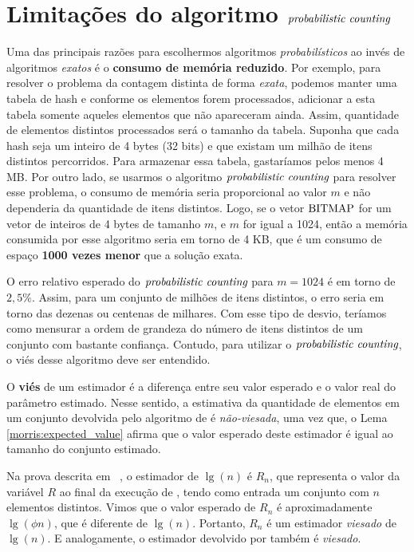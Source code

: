 \section{Limitações do algoritmo $\textit{probabilistic counting}$}

Uma das principais razões para escolhermos algoritmos \textit{probabilísticos} ao invés de algoritmos \textit{exatos} é 
o \textbf{consumo de memória reduzido}. Por exemplo, para resolver o problema da contagem distinta de forma 
\textit{exata}, podemos manter uma tabela de hash e conforme os elementos forem processados, adicionar a esta tabela 
somente aqueles elementos que não apareceram ainda. Assim,  quantidade de elementos distintos processados será o tamanho 
da tabela. Suponha que cada hash seja um inteiro de 4 bytes (32 bits) e que existam um milhão de itens distintos 
percorridos. Para armazenar essa tabela, gastaríamos pelos menos 4 MB. Por outro lado, se usarmos o algoritmo 
$\textit{probabilistic counting}$ para resolver esse problema, o consumo de memória seria proporcional ao valor $m$ e não dependeria da 
quantidade de itens distintos. Logo, se o vetor $\text{BITMAP}$ for um vetor de inteiros de 4 bytes de tamanho $m$, e 
$m$ for igual a 1024, então a memória consumida por esse algoritmo seria em torno de 4 KB, que é um consumo de espaço
\textbf{1000 vezes menor} que a solução exata.

O erro relativo esperado do $\textit{probabilistic counting}$ para $m = 1024$ é em torno de $2{,}5\%$. Assim, para um conjunto de milhões de 
itens distintos, o erro seria em torno das dezenas ou centenas de milhares. Com esse tipo de desvio, teríamos como 
mensurar a ordem de grandeza do número de itens distintos de um conjunto com bastante confiança. Contudo, para utilizar
o $\textit{probabilistic counting}$, o viés desse algoritmo deve ser entendido.

O \textbf{viés} de um estimador é a diferença entre seu valor esperado e o valor real do parâmetro estimado. 
Nesse sentido, a estimativa da quantidade de elementos em um conjunto devolvida pelo algoritmo de  é 
\textit{não-viesada}, uma vez que, o Lema \ref{morris:expected_value} afirma que o valor esperado deste estimador é 
igual ao tamanho do conjunto estimado.

Na prova descrita em ~\citep{flajolet:martin:85}, o estimador de $\lg(n)$ é $R_n$, que representa o valor da variável 
$R$ ao final da execução de , tendo como entrada um conjunto com $n$ elementos distintos. 
Vimos que o valor esperado de $R_n$ é aproximadamente $\lg(\phi n)$, que é diferente de $\lg(n)$. Portanto, $R_n$ é um 
estimador \textit{viesado} de $\lg(n)$. E analogamente, o estimador devolvido por  também 
é \textit{viesado}.  

